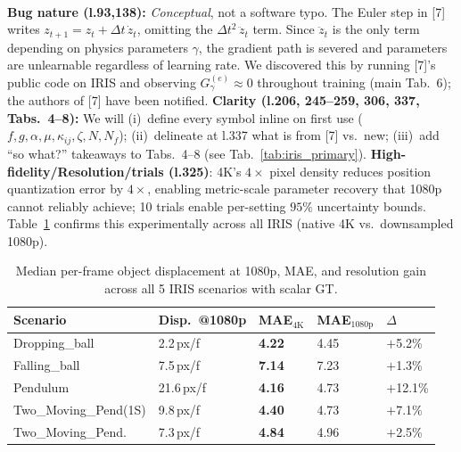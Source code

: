 \documentclass[10pt,twocolumn,letterpaper]{article}
\newcommand{\cgr}{\cellcolor{cgreen}}
\newcommand{\Rev}[1]
{\noindent{\color{eccvblue}\textbf{Reviewer~#1:}}}
\newcommand{\sub}[1]{\textbf{#1:}}
\newcommand{\method}{IRIS}
\begin{document}
\Rev{MCJw}\\
\sub{Bug nature (l.93,138)} \emph{Conceptual}, not a software typo. The Euler step in [7] writes $z_{t+1}{=}z_t{+}\Delta t\,\dot z_t$, omitting the $\Delta t^2\,\ddot z_t$ term. Since $\ddot z_t$ is the only term depending on physics parameters $\gamma$, the gradient path is severed and parameters are unlearnable regardless of learning rate. We discovered this by running [7]'s public code on \method{} and observing $G_\gamma^{(e)}{\approx}0$ throughout training (main Tab.~6); the authors of [7] have been notified.
\sub{Clarity (l.206, 245--259, 306, 337, Tabs.~4--8)} We will (i)~define every symbol inline on first use ($f, g, \alpha, \mu, \kappa_{ij}, \zeta, N, N_f$); (ii)~delineate at l.337 what is from [7] vs.\ new; (iii)~add ``so what?'' takeaways to Tabs.~4--8 (see Tab.~\ref{tab:iris_primary}). \textbf{High-fidelity/Resolution/trials (l.325)}: 4K's $4{\times}$ pixel density reduces position quantization error by $4{\times}$, enabling metric-scale parameter recovery that 1080p cannot reliably achieve; 10 trials enable per-setting $95\%$ uncertainty bounds. Table~\ref{tab:resolution} confirms this experimentally across all IRIS (native 4K vs.\ downsampled 1080p).

\begin{table}[h]
\vspace{-6pt}
\centering
\setlength{\tabcolsep}{1pt}
\renewcommand{\arraystretch}{0.2}
\scriptsize
\scalebox{0.75}
{\small
\begin{tabular}{lllll}
\toprule
Scenario & Disp.\ @1080p & MAE$_{\text{4K}}$ & MAE$_{\text{1080p}}$ & $\Delta$ \\
\midrule
Dropping\_ball        & 2.2\,px/f & \textbf{4.22} & 4.45 & \cgr$+$5.2\% \\
Falling\_ball         & 7.5\,px/f & \textbf{7.14} & 7.23 & \cgr$+$1.3\% \\
Pendulum               & 21.6\,px/f & \textbf{4.16} & 4.73 & \cgr$+$12.1\% \\
Two\_Moving\_Pend(1S) & 9.8\,px/f & \textbf{4.40} & 4.73 & \cgr$+$7.1\% \\
Two\_Moving\_Pend.    & 7.3\,px/f & \textbf{4.84} & 4.96 & \cgr$+$2.5\% \\
\bottomrule
\end{tabular}}
\caption{Median per-frame object displacement at 1080p, MAE, and resolution gain across all 5 IRIS scenarios with scalar GT.}
\label{tab:resolution}
\vspace{-10pt}
\end{table}
\end{document}
